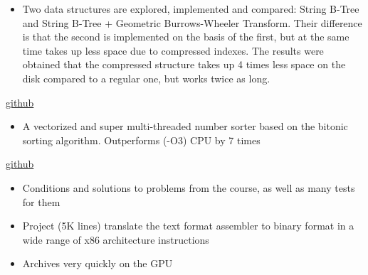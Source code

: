 \documentclass[10pt,a4paper]{altacv}
\begin{document}




\begin{itemize}
  \item \small{Two data structures are explored, implemented and compared: String B-Tree and String B-Tree + Geometric Burrows-Wheeler Transform. Their difference is that the second is implemented on the basis of the first, but at the same time takes up less space due to compressed indexes. The results were obtained that the compressed structure takes up 4 times less space on the disk compared to a regular one, but works twice as long.}
\end{itemize}
\divider

 {\href{https://github.com/DenRen/HW_Vladimirov/tree/main/hidra}{github}}
\begin{itemize}
  \item \small{A vectorized and super multi-threaded number sorter based on the bitonic sorting algorithm. Outperforms (-O3) CPU by 7 times}
\end{itemize}
\divider

 {\href{https://github.com/DenRen/BabichevAlgo}{github}}
\begin{itemize}
  \item \small{Conditions and solutions to problems from the course, as well as many tests for them}
\end{itemize}
\divider

\begin{itemize}
  \item \small{Project (5K lines) translate the text format assembler to binary format in a wide range of x86 architecture instructions}
\end{itemize}
\divider

\begin{itemize}
  \item \small{Archives very quickly on the GPU}
\end{itemize}
\divider
\end{document}
